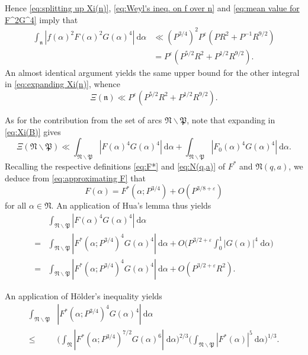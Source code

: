 \documentclass[12pt,english,reqno]{amsart}
\theoremstyle{definition}
\theoremstyle{remark}
\numberwithin{equation}{section}
\numberwithin{equation}{section}
\numberwithin{figure}{section}
\theoremstyle{plain}
\theoremstyle{plain}
\theoremstyle{plain}
\theoremstyle{plain}
\numberwithin{equation}{section}
\numberwithin{thm}{section}
\begin{document}
Hence \eqref{eq:splitting up Xi(n)}, \eqref{eq:Weyl's ineq. on f over n}
and \eqref{eq:mean value for F^2G^4} imply that
\begin{align*}
\int_{\mathfrak{n}}|f(\alpha)^{2}F(\alpha)^{2}G(\alpha)^{4}|\:\mathrm{d}\alpha&\ll(P^{3/4})^{2}P^{\varepsilon}(PR^{2}+P^{-1}R^{9/2})\\
&=P^{\varepsilon}(P^{5/2}R^{2}+P^{1/2}R^{9/2}).\end{align*}
An almost identical argument yields the same upper bound for the other integral in \eqref{eq:expanding Xi(n)}, whence
\begin{equation}
\Xi(\mathfrak{n})\ll P^{\varepsilon}(P^{5/2}R^{2}+P^{1/2}R^{9/2}).\label{eq:estimate for Xi(n)}\end{equation}
\par As for the contribution from the set of arcs $\mathfrak{N}\backslash\mathfrak{P}$,
note that expanding in \eqref{eq:Xi(B)} gives
\begin{equation}
\Xi(\mathfrak{N}\backslash\mathfrak{P})\ll\int_{\mathfrak{N}\backslash\mathfrak{P}}|F(\alpha)^{4}G(\alpha)^{4}|\:\mathrm{d}\alpha+\int_{\mathfrak{N}\backslash\mathfrak{P}}|F_{0}(\alpha)^{4}G(\alpha)^{4}|\:\mathrm{d}\alpha.\label{eq:expanding Xi(N-P)}\end{equation}
Recalling the respective definitions \eqref{eq:F*} and \eqref{eq:N(q,a)} of $F^*$ and $\mathfrak{N}(q,a)$, we deduce from \eqref{eq:approximating F} that
\[ F(\alpha)=F^*(\alpha;P^{3/4})+O(P^{3/8+\varepsilon})\]
for all $\alpha\in\mathfrak{N}$. An application of Hua's lemma thus yields
\begin{align}
&\int_{\mathfrak{N}\backslash\mathfrak{P}}|F(\alpha)^{4}G(\alpha)^{4}|\:\mathrm{d}\alpha\nonumber\\
=&\int_{\mathfrak{N}\backslash\mathfrak{P}}|F^*(\alpha;P^{3/4})^{4}G(\alpha)^{4}|\:\mathrm{d}\alpha+O\Big(P^{3/2+\varepsilon}\int_{0}^{1}|G(\alpha)|^4\;\mathrm{d}\alpha\Big)\nonumber\\
=&\int_{\mathfrak{N}\backslash\mathfrak{P}}|F^*(\alpha;P^{3/4})^{4}G(\alpha)^{4}|\:\mathrm{d}\alpha+O(P^{3/2+\varepsilon}R^2).\label{eq:replacing F by F*}\end{align}
\par An application of H\"{o}lder's inequality yields
\begin{align}
\int_{\mathfrak{N}\backslash\mathfrak{P}}&|F^*(\alpha;P^{3/4})^{4}G(\alpha)^{4}|\:\mathrm{d}\alpha\nonumber\\
\leq&\Big(\int_{\mathfrak{N}}|F^*(\alpha;P^{3/4})^{7/2}G(\alpha)^6|\;\mathrm{d}\alpha\Big)^{2/3}\Big(\int_{\mathfrak{N}\backslash\mathfrak{P}}|F^*(\alpha)|^{5}\:\mathrm{d}\alpha\Big)^{1/3}.\label{eq:Holder on int(F^4G^4) over N without P}\end{align}
\end{document}
